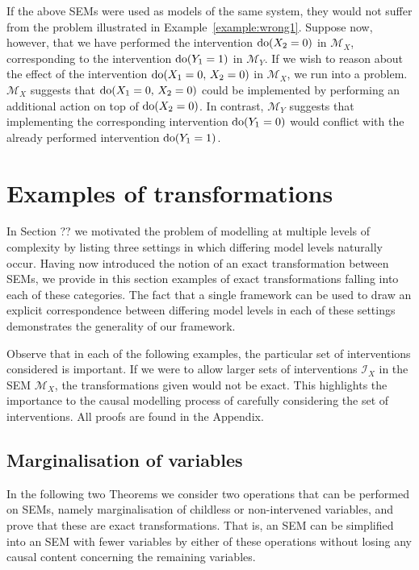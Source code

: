 If the above SEMs were used as models of the same system, they would not suffer from the problem illustrated in Example~\ref{example:wrong1}.
Suppose now, however, that we have performed the intervention $\operatorname{do}(X_2=0)$ in $\mathcal{M}_X$, corresponding to the intervention $\operatorname{do}(Y_1=1)$ in $\mathcal{M}_Y$.
If we wish to reason about the effect of the intervention $\operatorname{do}(X_1=0,\, X_2=0)$ in $\mathcal{M}_X$, we run into a problem.
$\mathcal{M}_X$ suggests that $\operatorname{do}(X_1=0,\, X_2=0)$ could be implemented by performing an additional action on top of $\operatorname{do}(X_2=0)$.
In contrast, $\mathcal{M}_Y$ suggests that implementing the corresponding intervention $\operatorname{do}(Y_1=0)$ would conflict with the already performed intervention $\operatorname{do}(Y_1=1)$.


\section{Examples of transformations}

In Section ?? we motivated the problem of modelling at multiple levels of complexity by listing three settings in which differing model levels naturally occur.
Having now introduced the notion of an exact transformation between SEMs, we provide in this section examples of exact transformations falling into each of these categories.
The fact that a single framework can be used to draw an explicit correspondence between differing model levels in each of these settings demonstrates the generality of our framework.

Observe that in each of the following examples, the particular set of interventions considered is important. If we were to allow larger sets of interventions $\mathcal{I}_X$ in the SEM $\mathcal{M}_X$, the transformations given would not be exact. This highlights the importance to the causal modelling process of carefully considering the set of interventions.  All proofs are found in  the Appendix.






\subsection{Marginalisation of variables}\label{sec:basic_trafos}

In the following two Theorems we consider two operations that can be performed on SEMs, namely marginalisation of childless or non-intervened variables, and prove that these are exact transformations.
That is, an SEM can be simplified into an SEM with fewer variables by either of these operations without losing any causal content concerning the remaining variables.

